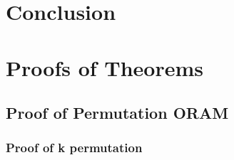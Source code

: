 \documentclass[a4paper]{article}
\begin{document}
\section{Conclusion}

{}


\clearpage
\appendix 
\section{Proofs of Theorems}

\subsection{Proof of Permutation ORAM}
\subsubsection{Proof of k permutation}
\end{document}
